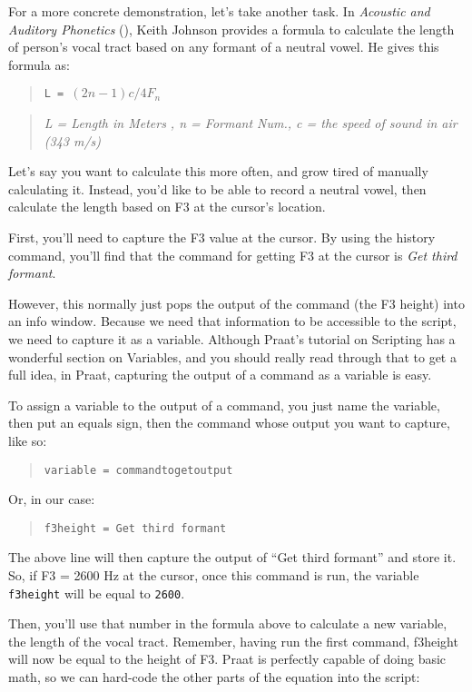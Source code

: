 \documentclass[11pt]{article}
\begin{document}
For a more concrete demonstration, let's take another task. In
\emph{Acoustic and Auditory Phonetics} (\cite{Johnson:1997aa}), Keith
Johnson provides a formula to calculate the length of person's vocal
tract based on any formant of a neutral vowel. He gives this formula as:

\begin{quote}
\texttt{L = $(2n-1)c/4F_n$}
\end{quote}

\begin{quote}
\emph{L = Length in Meters , n = Formant Num., c = the speed of sound in
air (343 m/s)}
\end{quote}

Let's say you want to calculate this more often, and grow tired of
manually calculating it. Instead, you'd like to be able to record a
neutral vowel, then calculate the length based on F3 at the cursor's
location.

First, you'll need to capture the F3 value at the cursor. By using the
history command, you'll find that the command for getting F3 at the
cursor is \emph{Get third formant}.

However, this normally just pops the output of the command (the F3
height) into an info window. Because we need that information to be
accessible to the script, we need to capture it as a variable. Although
Praat's tutorial on Scripting has a wonderful section on Variables, and
you should really read through that to get a full idea, in Praat,
capturing the output of a command as a variable is easy.

To assign a variable to the output of a command, you just name the
variable, then put an equals sign, then the command whose output you
want to capture, like so:

\begin{quote}
\texttt{variable = commandtogetoutput}
\end{quote}

Or, in our case:

\begin{quote}
\texttt{f3height = Get third formant}
\end{quote}

The above line will then capture the output of ``Get third formant'' and
store it. So, if F3 = 2600 Hz at the cursor, once this command is run,
the variable \texttt{f3height} will be equal to \texttt{2600}.

Then, you'll use that number in the formula above to calculate a new
variable, the length of the vocal tract. Remember, having run the first
command, f3height will now be equal to the height of F3. Praat is
perfectly capable of doing basic math, so we can hard-code the other
parts of the equation into the script:
\end{document}
